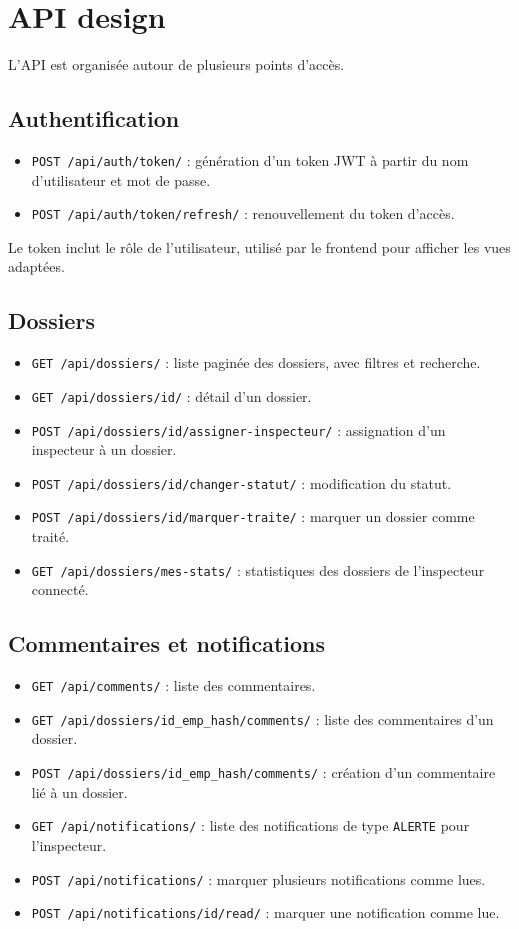 \documentclass[12pt,a4paper]{article}
\begin{document}
\section{API design}
L'API est organisée autour de plusieurs points d’accès.

\subsection{Authentification}
\begin{itemize}
    \item \texttt{POST /api/auth/token/} : génération d'un token JWT à partir du nom d'utilisateur et mot de passe.
    \item \texttt{POST /api/auth/token/refresh/} : renouvellement du token d’accès.
\end{itemize}

Le token inclut le rôle de l'utilisateur, utilisé par le frontend pour afficher les vues adaptées.

\subsection{Dossiers}
\begin{itemize}
    \item \texttt{GET /api/dossiers/} : liste paginée des dossiers, avec filtres et recherche.
    \item \texttt{GET /api/dossiers/{id}/} : détail d’un dossier.
    \item \texttt{POST /api/dossiers/{id}/assigner-inspecteur/} : assignation d'un inspecteur à un dossier.
    \item \texttt{POST /api/dossiers/{id}/changer-statut/} : modification du statut.
    \item \texttt{POST /api/dossiers/{id}/marquer-traite/} : marquer un dossier comme traité.
    \item \texttt{GET /api/dossiers/mes-stats/} : statistiques des dossiers de l’inspecteur connecté.
\end{itemize}

\subsection{Commentaires et notifications}
\begin{itemize}
    \item \texttt{GET /api/comments/} : liste des commentaires.
    \item \texttt{GET /api/dossiers/{id_emp_hash}/comments/} : liste des commentaires d’un dossier.
    \item \texttt{POST /api/dossiers/{id_emp_hash}/comments/} : création d’un commentaire lié à un dossier.
    \item \texttt{GET /api/notifications/} : liste des notifications de type \texttt{ALERTE} pour l’inspecteur.
    \item \texttt{POST /api/notifications/} : marquer plusieurs notifications comme lues.
    \item \texttt{POST /api/notifications/{id}/read/} : marquer une notification comme lue.
\end{itemize}
\end{document}
